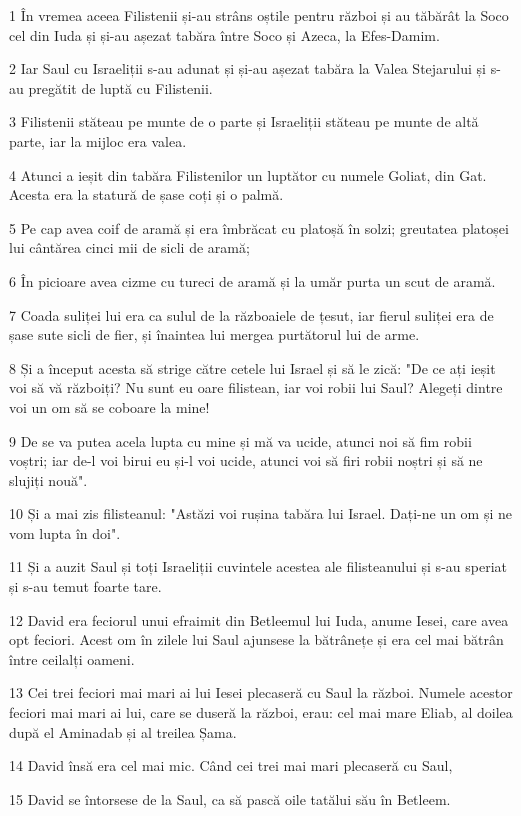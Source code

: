 \par 1 În vremea aceea Filistenii și-au strâns oștile pentru război și au tăbărât la Soco cel din Iuda și și-au așezat tabăra între Soco și Azeca, la Efes-Damim.
\par 2 Iar Saul cu Israeliții s-au adunat și și-au așezat tabăra la Valea Stejarului și s-au pregătit de luptă cu Filistenii.
\par 3 Filistenii stăteau pe munte de o parte și Israeliții stăteau pe munte de altă parte, iar la mijloc era valea.
\par 4 Atunci a ieșit din tabăra Filistenilor un luptător cu numele Goliat, din Gat. Acesta era la statură de șase coți și o palmă.
\par 5 Pe cap avea coif de aramă și era îmbrăcat cu platoșă în solzi; greutatea platoșei lui cântărea cinci mii de sicli de aramă;
\par 6 În picioare avea cizme cu tureci de aramă și la umăr purta un scut de aramă.
\par 7 Coada suliței lui era ca sulul de la războaiele de țesut, iar fierul suliței era de șase sute sicli de fier, și înaintea lui mergea purtătorul lui de arme.
\par 8 Și a început acesta să strige către cetele lui Israel și să le zică: "De ce ați ieșit voi să vă războiți? Nu sunt eu oare filistean, iar voi robii lui Saul? Alegeți dintre voi un om să se coboare la mine!
\par 9 De se va putea acela lupta cu mine și mă va ucide, atunci noi să fim robii voștri; iar de-l voi birui eu și-l voi ucide, atunci voi să firi robii noștri și să ne slujiți nouă".
\par 10 Și a mai zis filisteanul: "Astăzi voi rușina tabăra lui Israel. Dați-ne un om și ne vom lupta în doi".
\par 11 Și a auzit Saul și toți Israeliții cuvintele acestea ale filisteanului și s-au speriat și s-au temut foarte tare.
\par 12 David era feciorul unui efraimit din Betleemul lui Iuda, anume Iesei, care avea opt feciori. Acest om în zilele lui Saul ajunsese la bătrânețe și era cel mai bătrân între ceilalți oameni.
\par 13 Cei trei feciori mai mari ai lui Iesei plecaseră cu Saul la război. Numele acestor feciori mai mari ai lui, care se duseră la război, erau: cel mai mare Eliab, al doilea după el Aminadab și al treilea Șama.
\par 14 David însă era cel mai mic. Când cei trei mai mari plecaseră cu Saul,
\par 15 David se întorsese de la Saul, ca să pască oile tatălui său în Betleem.
